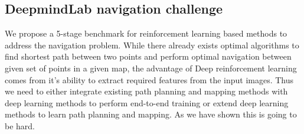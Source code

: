 

\subsection{DeepmindLab navigation challenge}
We propose a 5-stage benchmark for reinforcement learning based methods to address the navigation problem.
While there already exists optimal algorithms to find shortest path between two points and perform optimal navigation between given set of points in a given map, the advantage of Deep reinforcement learning comes from it's ability to extract required features from the input images.
Thus we need to either integrate existing path planning and mapping methods with deep learning methods to perform end-to-end training or extend deep learning methods to learn path planning and mapping.
As we have shown this is going to be hard.
